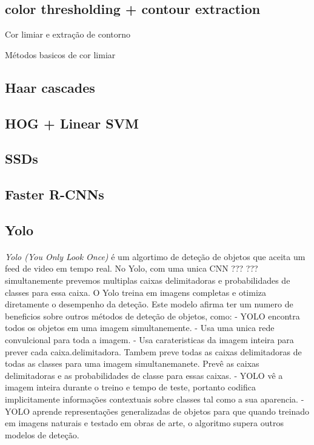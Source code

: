 \subsection{color thresholding + contour extraction}

Cor limiar e extração de contorno

Métodos basicos de cor limiar 

\subsection{Haar cascades}

\subsection{HOG + Linear SVM}

\subsection{SSDs}

\subsection{Faster R-CNNs}

\subsection{Yolo}
\paragraph{}
\textit{Yolo (You Only Look Once)} é um algortimo de deteção de objetos que aceita um feed de video em tempo real.
No Yolo, com uma unica CNN ??? ??? simultanemente prevemos multiplas caixas delimitadoras e probabilidades de classes para essa caixa. O Yolo treina em imagens completas e otimiza diretamente o desempenho da deteção. Este modelo afirma ter um numero de beneficios sobre outros métodos de deteção de objetos, como:
\newline - YOLO encontra todos os objetos em uma imagem simultanemente.
\newline - Usa uma unica rede convulcional para toda a imagem.
\newline - Usa carateristicas da imagem inteira para prever cada caixa.delimitadora. Tambem preve todas as caixas delimitadoras de todas as classes para uma imagem simultanemanete. Prevê as caixas delimitadoras e as probabilidades de classe para essas caixas.
\newline - YOLO vê a imagem inteira durante o treino e tempo de teste, portanto codifica implicitamente informações contextuais sobre classes tal como a sua aparencia.
\newline - YOLO aprende representações generalizadas de objetos para que quando treinado em imagens naturais e testado em obras de arte, o algoritmo supera outros modelos de deteção.

